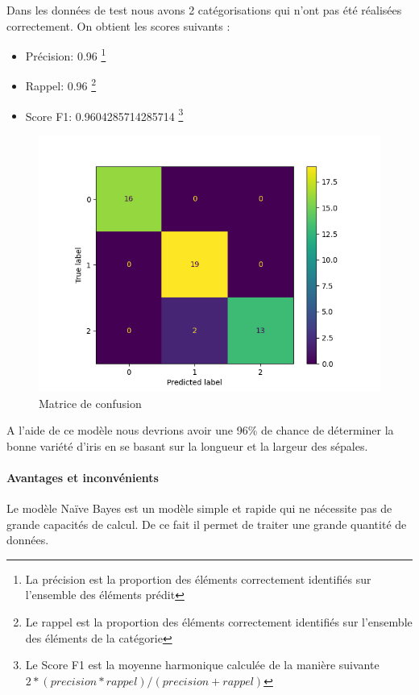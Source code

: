 \documentclass[a4paper,12pt]{article}
\begin{document}
				Dans les données de test nous avons 2 catégorisations qui n'ont pas été réalisées correctement. On obtient les scores suivants :
				\begin{itemize}
					\item Précision: 0.96                    \footnote{La précision est la proportion des éléments correctement identifiés sur l'ensemble des éléments prédit}
					\item Rappel: 0.96						\footnote{Le rappel est la proportion des éléments correctement identifiés sur l'ensemble des éléments de la catégorie}
					\item Score F1: 0.9604285714285714		\footnote{Le Score F1 est la moyenne harmonique calculée de la manière suivante $2*(precision*rappel)/(precision+rappel)$}
				\end{itemize}				
				
				\begin{figure}[H]
					\centering
					\includegraphics[scale=0.7]{img/NBmatrix.png}
					\caption{Matrice de confusion}
				\end{figure}
				
				A l'aide de ce modèle nous devrions avoir une 96\% de chance de déterminer la bonne variété d'iris en se basant sur la longueur et la largeur des sépales.  
				
			\paragraph{Avantages et inconvénients} 
				Le modèle Naïve Bayes est un modèle simple et rapide qui ne nécessite pas de grande capacités de calcul. De ce fait il permet de traiter une grande quantité de données.\\
				
\end{document}
